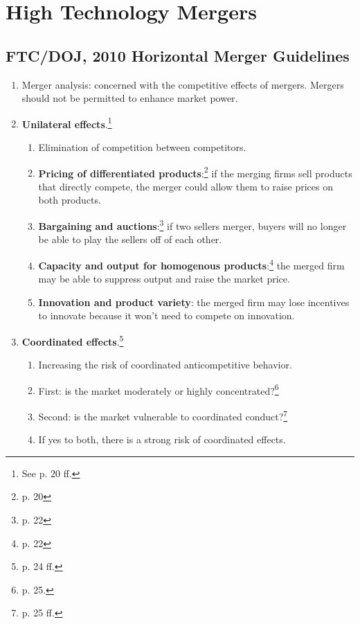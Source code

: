 \section{High Technology Mergers}

\subsection{FTC/DOJ, 2010 Horizontal Merger Guidelines}

\begin{enumerate}
    \item Merger analysis: concerned with the competitive effects of mergers. 
    Mergers should not be permitted to enhance market power.
    \item \textbf{Unilateral effects}.\footnote{See p. 20 ff.}
    \begin{enumerate}
        \item Elimination of competition between competitors.
        \item \textbf{Pricing of differentiated products}:\footnote{p. 20} if 
        the merging firms sell products that directly compete, the merger 
        could allow them to raise prices on both products.
        \item \textbf{Bargaining and auctions}:\footnote{p. 22} if two 
        sellers merger, buyers will no longer be able to play the sellers off 
        of each other.
        \item \textbf{Capacity and output for homogenous 
        products}:\footnote{p. 22} the merged firm may be able to suppress 
        output and raise the market price.
        \item \textbf{Innovation and product variety}: the merged firm may 
        lose incentives to innovate because it won't need to compete on 
        innovation.
    \end{enumerate}
    \item \textbf{Coordinated effects}.\footnote{p. 24 ff.}
    \begin{enumerate}
        \item Increasing the risk of coordinated anticompetitive behavior.
        \item First: is the market moderately or highly 
        concentrated?\footnote{p. 25.}
        \item Second: is the market vulnerable to coordinated 
        conduct?\footnote{p. 25 ff.}
        \item If yes to both, there is a strong risk of coordinated effects.
    \end{enumerate}
\end{enumerate}

